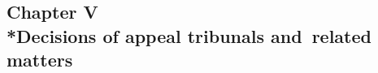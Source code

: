 \documentclass[12pt,a4paper]{article}
\begin{document}
%
%
%
%
%
%
%
%
%
%

\subsection[Chapter V --- Decisions of appeal tribunals and~related matters]{Chapter V\\*Decisions of appeal tribunals and~related matters}
\end{document}
